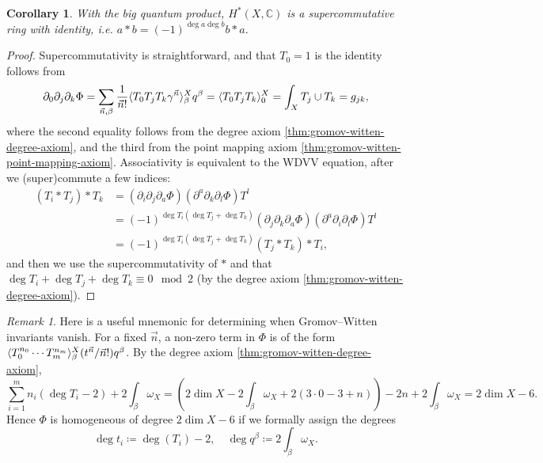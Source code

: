 \documentclass{report}
\theoremstyle{plain}
\newtheorem{corollary}[theorem]{Corollary}
\theoremstyle{definition}
\theoremstyle{remark}
\newtheorem*{remark}{Remark}
\newcommand{\di}{\partial}
\newcommand{\bC}{\mathbb{C}}
\DeclarePairedDelimiter{\inner}{\langle}{\rangle}
\begin{document}
\begin{corollary}
  With the big quantum product, $H^*(X, \bC)$ is a supercommutative
  ring with identity, i.e. $a * b = (-1)^{\deg a \deg b} b * a$.
\end{corollary}

\begin{proof}
  Supercommutativity is straightforward, and that $T_0 = 1$ is the
  identity follows from
  \[ \di_0 \di_j \di_k \Phi = \sum_{\vec n,\beta} \frac{1}{\vec n!} \inner{T_0T_jT_k\gamma^{\vec n}}_\beta^X q^\beta = \inner{T_0T_jT_k}_0^X = \int_X T_j \cup T_k = g_{jk}, \]
  where the second equality follows from the degree axiom
  \ref{thm:gromov-witten-degree-axiom}, and the third from the point
  mapping axiom \ref{thm:gromov-witten-point-mapping-axiom}.
  Associativity is equivalent to the WDVV equation, after we
  (super)commute a few indices:
  \begin{align*}
    (T_i * T_j) * T_k
    &= (\di_i \di_j \di_a \Phi) (\di^a \di_k \di_l \Phi) T^l \\
    &= (-1)^{\deg T_i (\deg T_j + \deg T_k)} (\di_j \di_k \di_a \Phi) (\di^a \di_i \di_l \Phi) T^l \\
    &= (-1)^{\deg T_i(\deg T_j + \deg T_k)} (T_j * T_k) * T_i,
  \end{align*}
  and then we use the supercommutativity of $*$ and that $\deg T_i +
  \deg T_j + \deg T_k \equiv 0 \mod 2$ (by the degree axiom
  \ref{thm:gromov-witten-degree-axiom}).
\end{proof}

\begin{remark}
  Here is a useful mnemonic for determining when Gromov--Witten
  invariants vanish. For a fixed $\vec n$, a non-zero term in $\Phi$ is of
  the form $\inner{T_0^{n_0}\cdots T_m^{n_m}}_\beta^X (t^{\vec n}/\vec n!)
  q^\beta$. By the degree axiom \ref{thm:gromov-witten-degree-axiom},
  \[ \sum_{i=1}^m n_i(\deg T_i - 2) + 2\int_\beta \omega_X = \left(2\dim X - 2\int_\beta \omega_X + 2(3 \cdot 0 - 3 + n)\right) - 2n + 2\int_\beta \omega_X = 2 \dim X - 6. \]
  Hence $\Phi$ is homogeneous of degree $2\dim X - 6$ if we formally
  assign the degrees
  \begin{equation} \label{eq:gromov-witten-potential-formal-degrees}
    \deg t_i \coloneqq \deg(T_i) - 2, \quad \deg q^\beta \coloneqq 2\int_\beta \omega_X.
  \end{equation}
\end{remark}
\end{document}
